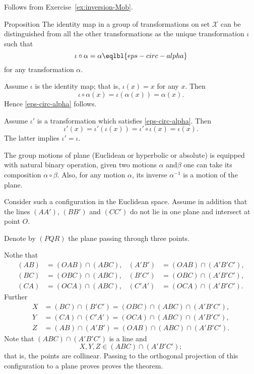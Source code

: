 {
Follows from
Exercise~\ref{ex:inversion-Mob}.













\begin{thm}{Proposition}
The identity map in a group of transformations on set $\mathcal X$ can be distinguished
from all the other transformations as the unique transformation $\iota$ such that
\[\iota\circ\alpha=\alpha
\eqlbl{eps-circ-alpha}\] 
for any transformation $\alpha$.
\end{thm}

Assume $\iota$ is the identity map;
that is, $\iota(x)=x$ for any  $x$.
Then 
\[\iota\circ\alpha(x)=\iota(\alpha(x))=\alpha(x).\]
Hence \ref{eps-circ-alpha} follows.

Assume $\iota'$ is a transformation which satisfies \ref{eps-circ-alpha}.
Then 
\[\iota'(x)=\iota'(\iota(x))=\iota'\circ\iota(x)=\iota(x).\]
The latter implies $\iota'=\iota$.
\qeds














The group motions of plane (Euclidean or hyperbolic or absolute) is equipped with natural binary operation, given two motions $\alpha$ and$\beta$ one can take its composition $\alpha\circ\beta$.
Also, for any motion $\alpha$,
its inverse $\alpha^{-1}$ is a motion of the plane.












Consider such a configuration in the Euclidean space.
Assume in addition that the lines $(AA')$, $(BB')$ and $(CC')$ do not lie in one plane and intersect at point $O$.

Denote by $(PQR)$ the plane passing through three points.

Nothe that
\begin{align*}
(AB)&= (OAB)\cap (ABC),&
(A'B')&= (OAB)\cap (A'B'C'),\\
(BC)&= (OBC)\cap (ABC),&
(B'C')&= (OBC)\cap (A'B'C'),\\
(CA)&= (OCA)\cap (ABC),&
(C'A')&= (OCA)\cap (A'B'C').
\end{align*}
Further
\begin{align*}
X&=(BC)\cap(B'C')=(OBC)\cap (ABC)\cap (A'B'C'),\\
Y&=(CA)\cap(C'A')=(OCA)\cap (ABC)\cap (A'B'C'),\\
Z&=(AB)\cap(A'B')=(OAB)\cap (ABC)\cap (A'B'C').
\end{align*}
Note that $(ABC)\cap (A'B'C')$ is a line and
\[X,Y,Z\in (ABC)\cap (A'B'C');\]
that is, the points are collinear. 
Passing  to the orthogonal projection of this configuration to a plane proves proves the theorem.

}
